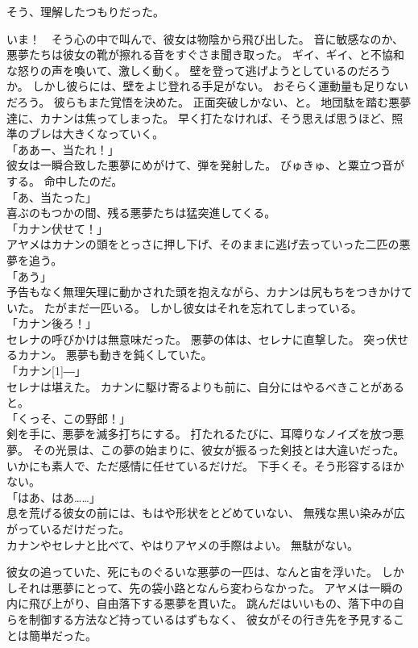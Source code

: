 \documentclass[../IHMain]{subfiles}
\begin{document}
そう、理解したつもりだった。

いま！　そう心の中で叫んで、彼女は物陰から飛び出した。
音に敏感なのか、悪夢たちは彼女の靴が擦れる音をすぐさま聞き取った。
ギイ、ギイ、と不協和な怒りの声を喚いて、激しく動く。
壁を登って逃げようとしているのだろうか。
しかし彼らには、壁をよじ登れる手足がない。
おそらく運動量も足りないだろう。
彼らもまた覚悟を決めた。
正面突破しかない、と。
地団駄を踏む悪夢達に、カナンは焦ってしまった。
早く打たなければ、そう思えば思うほど、照準のブレは大きくなっていく。\\
「ああー、当たれ！」\\
彼女は一瞬合致した悪夢にめがけて、弾を発射した。
びゅきゅ、と粟立つ音がする。
命中したのだ。\\
「あ、当たった」\\
喜ぶのもつかの間、残る悪夢たちは猛突進してくる。\\
「カナン伏せて！」\\
アヤメはカナンの頭をとっさに押し下げ、そのままに逃げ去っていった二匹の悪夢を追う。\\
「あう」\\
予告もなく無理矢理に動かされた頭を抱えながら、カナンは尻もちをつきかけていた。
たがまだ一匹いる。
しかし彼女はそれを忘れてしまっている。\\
「カナン後ろ！」\\
セレナの呼びかけは無意味だった。
悪夢の体は、セレナに直撃した。
突っ伏せるカナン。
悪夢も動きを鈍くしていた。\\
「カナン\scalebox{3}[1]{―}」\\
セレナは堪えた。
カナンに駆け寄るよりも前に、自分にはやるべきことがあると。\\
「くっそ、この野郎！」\\
剣を手に、悪夢を滅多打ちにする。
打たれるたびに、耳障りなノイズを放つ悪夢。
その光景は、この夢の始まりに、彼女が振るった剣技とは大違いだった。
いかにも素人で、ただ感情に任せているだけだ。
下手くそ。そう形容するほかない。\\
「はあ、はあ……」\\
息を荒げる彼女の前には、もはや形状をとどめていない、
無残な黒い染みが広がっているだけだった。\\

カナンやセレナと比べて、やはりアヤメの手際はよい。
無駄がない。

彼女の追っていた、死にものぐるいな悪夢の一匹は、なんと宙を浮いた。
しかしそれは悪夢にとって、先の袋小路となんら変わらなかった。
アヤメは一瞬の内に飛び上がり、自由落下する悪夢を貫いた。
跳んだはいいもの、落下中の自らを制御する方法など持っているはずもなく、
彼女がその行き先を予見することは簡単だった。
\end{document}

